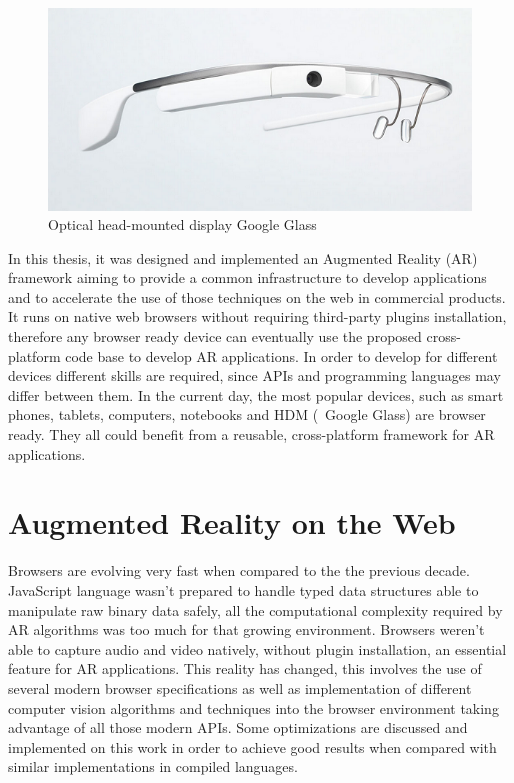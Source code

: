 \begin{figure}[!htb]
  \centering
  \includegraphics[width=\linewidth]{chapters/basic_concepts/google_glass.png}
  \caption{Optical head-mounted display Google Glass \cite{Glass2013}}
  \label{figure:google_glass}
\end{figure}

In this thesis, it was designed and implemented an Augmented Reality (AR) framework aiming to provide a common infrastructure to develop applications and to accelerate the use of those techniques on the web in commercial products. It runs on native web browsers without requiring third-party plugins installation, therefore any browser ready device can eventually use the proposed cross-platform code base to develop AR applications. In order to develop for different devices different skills are required, since APIs and programming languages may differ between them. In the current day, the most popular devices, such as smart phones, tablets, computers, notebooks and HDM (\ie\ Google Glass) are browser ready. They all could benefit from a reusable, cross-platform framework for AR applications.


\section{Augmented Reality on the Web} %
\label{sec:basic_concepts:augmented_reality_on_the_web}

Browsers are evolving very fast when compared to the the previous decade. JavaScript language wasn't prepared to handle typed data structures able to manipulate raw binary data safely, all the computational complexity required by AR algorithms was too much for that growing environment. Browsers weren't able to capture audio and video natively, without plugin installation, an essential feature for AR applications. This reality has changed, this involves the use of several modern browser specifications as well as implementation of different computer vision algorithms and techniques into the browser environment taking advantage of all those modern APIs. Some optimizations are discussed and implemented on this work in order to achieve good results when compared with similar implementations in compiled languages.

